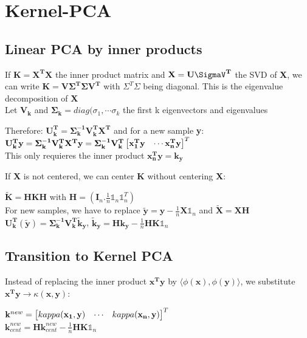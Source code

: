 \documentclass[english]{latex4ei/latex4ei_sheet}
\begin{document}
\section{Kernel-PCA}
\begin{sectionbox}
\subsection{Linear PCA by inner products}
If $\mathbf{K}=\mathbf{X^TX}$ the inner product matrix and $\mathbf{X=U\SigmaV^T}$ the SVD of \textbf{X}, we can write $\mathbf{K=V\Sigma^T\Sigma V^T}$ with \textbf{$\Sigma^T\Sigma$} being diagonal. This is the eigenvalue decomposition of \textbf{X}\\
Let $\mathbf{V_k}$ and $\mathbf{\Sigma_k}=diag(\sigma_1, \cdots\sigma_k$ the first k eigenvectors and eigenvalues
\begin{emphbox}
    Therefore: $\mathbf{U_k^T}=\mathbf{\Sigma_k^{-1}V_k^TX^T}$ and for a new sample \textbf{y}:\\
    $\mathbf{U_k^Ty}=\mathbf{\Sigma_k^{-1}V_k^TX^Ty}=\mathbf{\Sigma_k^{-1}V_k^T}\mat{\mathbf{x_1^Ty} & \cdots \mathbf{x_n^Ty}}^T$\\
    This only requieres the inner product $\mathbf{x_n^Ty=k_y}$
\end{emphbox}
If \textbf{X} is not centered, we can center \textbf{K} without centering \textbf{X}:
\begin{center}
    $\mathbf{\tilde{K}=HKH}$ with $\mathbf{H}=(\mathbf{I}_n.\frac{1}{n}\mathds{1}_n\mathds{1}_n^T)$\\
    For new samples, we have to replace $\mathbf{\tilde{y}}=\mathbf{y}-\frac{1}{n}\mathbf{X}\mathds{1}_n$ and $\mathbf{\tilde{X}=XH}$\\
    $\mathbf{U_k^T}(\mathbf{\tilde{y}})=\mathbf{\Sigma_k^{-1}V_k^T\tilde{k}_y}$, \quad $\mathbf{\tilde{k}_y=Hk_y-}\frac{1}{n}\mathbf{HK}\mathds{1}_n$
\end{center}

\subsection{Transition to Kernel PCA}
Instead of replacing the inner product $\mathbf{x^Ty}$ by $\langle\phi(\mathbf{x}),\phi(\mathbf{y})\rangle$, we substitute $\mathbf{x^Ty}\rightarrow\kappa(\mathbf{x,y})$:
\begin{emphbox}
    $\mathbf{k}^{new}=\mat{kappa(\mathbf{x_1,y}) & \cdots & kappa(\mathbf{x_n,y})}^T$\\
    $\mathbf{k}_{cent}^{new}=\mathbf{Hk}_{cent}^{new}-\frac{1}{n}\mathbf{HK}\mathds{1}_n$
\end{emphbox}

\end{sectionbox}
\end{document}

